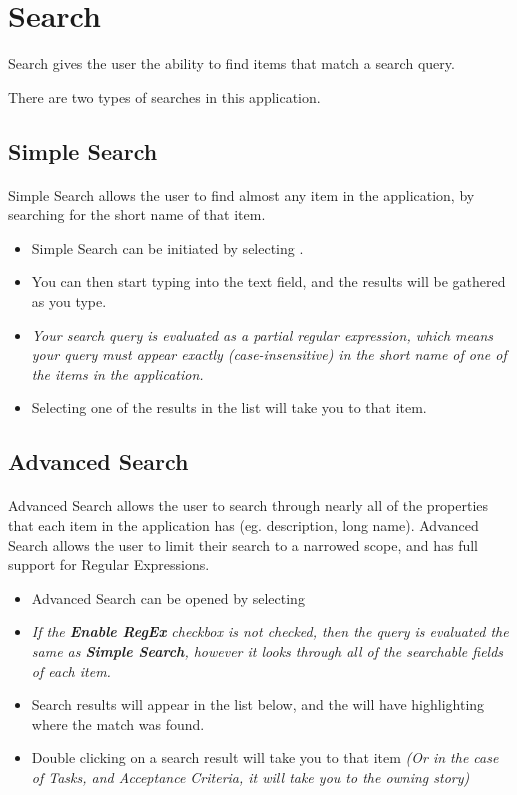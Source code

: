 \documentclass[11pt,fleqn]{book} %
\begin{document}
\section{Search}
Search gives the user the ability to find items that match a search query.

There are two types of searches in this application.

\subsection{Simple Search}
\paragraph{}
Simple Search allows the user to find almost any item in the application, by searching for the short name of that item.

\begin{itemize}
\item Simple Search can be initiated by selecting .
\item You can then start typing into the text field, and the results will be gathered as you type.
\item \textit{Your search query is evaluated as a partial regular expression, which means your query must appear exactly (case-insensitive) in the short name of one of the items in the application.}
\item Selecting one of the results in the list will take you to that item.
\end{itemize}

\subsection{Advanced Search}
\paragraph{}
Advanced Search allows the user to search through nearly all of the properties that each item in the application has (eg. description, long name).
Advanced Search allows the user to limit their search to a narrowed scope, and has full support for Regular Expressions.

\begin{itemize}
\item Advanced Search can be opened by selecting 
\item \textit{If the \textbf{Enable RegEx} checkbox is not checked, then the query is evaluated the same as \textbf{Simple Search}, however it looks through all of the searchable fields of each item.}
\item Search results will appear in the list below, and the will have highlighting where the match was found.
\item Double clicking on a search result will take you to that item \textit{(Or in the case of Tasks, and Acceptance Criteria, it will take you to the owning story)}
\end{itemize}
\end{document}

